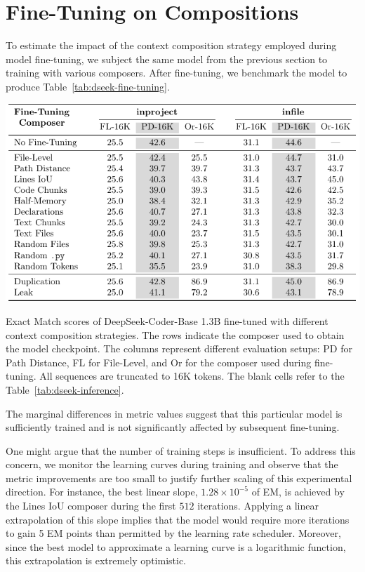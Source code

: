 \section{Fine-Tuning on Compositions}\label{sec:fine-tuning-on-compositions}

To estimate the impact of the context composition strategy employed during model fine-tuning, we subject the same model from the previous section to training with various composers. After fine-tuning, we benchmark the model to produce Table~\ref{tab:dseek-fine-tuning}.

\begin{table}[htbp]
    \centering
    \includegraphics[width=\textwidth]{tables/rq_a2.pdf}
    \caption{Exact Match scores of DeepSeek-Coder-Base 1.3B fine-tuned with different context composition strategies. The rows indicate the composer used to obtain the model checkpoint. The columns represent different evaluation setups: PD for Path Distance, FL for File-Level, and Or for the composer used during fine-tuning. All sequences are truncated to 16K tokens. The blank cells refer to the Table~\ref{tab:dseek-inference}.}\label{tab:dseek-fine-tuning}
\end{table}

The marginal differences in metric values suggest that this particular model is sufficiently trained and is not significantly affected by subsequent fine-tuning.

One might argue that the number of training steps is insufficient. To address this concern, we monitor the learning curves during training and observe that the metric improvements are too small to justify further scaling of this experimental direction. For instance, the best linear slope, \(1.28 \times 10^{-5}\) of EM, is achieved by the Lines IoU composer during the first \(512\) iterations. Applying a linear extrapolation of this slope implies that the model would require more iterations to gain 5 EM points than permitted by the learning rate scheduler. Moreover, since the best model to approximate a learning curve is a logarithmic function, this extrapolation is extremely optimistic.  %

